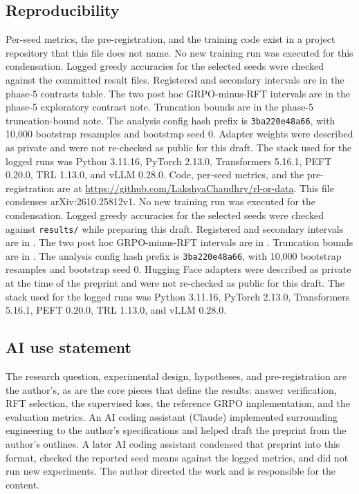 \subsection*{Reproducibility}
\ifanon
Per-seed metrics, the pre-registration, and the training code exist in a project repository that this file does not name. No new training run was executed for this condensation. Logged greedy accuracies for the selected seeds were checked against the committed result files. Registered and secondary intervals are in the phase-5 contrasts table. The two post hoc GRPO-minus-RFT intervals are in the phase-5 exploratory contrast note. Truncation bounds are in the phase-5 truncation-bound note. The analysis config hash prefix is \texttt{3ba220e48a66}, with 10{,}000 bootstrap resamples and bootstrap seed 0. Adapter weights were described as private and were not re-checked as public for this draft. The stack used for the logged runs was Python 3.11.16, PyTorch 2.13.0, Transformers 5.16.1, PEFT 0.20.0, TRL 1.13.0, and vLLM 0.28.0.
\else
Code, per-seed metrics, and the pre-registration are at \url{https://github.com/LakshyaChaudhry/rl-or-data}. This file condenses arXiv:2610.25812v1. No new training run was executed for the condensation. Logged greedy accuracies for the selected seeds were checked against \texttt{results/} while preparing this draft. Registered and secondary intervals are in . The two post hoc GRPO-minus-RFT intervals are in . Truncation bounds are in . The analysis config hash prefix is \texttt{3ba220e48a66}, with 10{,}000 bootstrap resamples and bootstrap seed 0. Hugging Face adapters were described as private at the time of the preprint and were not re-checked as public for this draft. The stack used for the logged runs was Python 3.11.16, PyTorch 2.13.0, Transformers 5.16.1, PEFT 0.20.0, TRL 1.13.0, and vLLM 0.28.0.
\fi

\subsection*{AI use statement}
The research question, experimental design, hypotheses, and pre-registration are the author's, as are the core pieces that define the results: answer verification, RFT selection, the supervised loss, the reference GRPO implementation, and the evaluation metrics. An AI coding assistant (Claude) implemented surrounding engineering to the author's specifications and helped draft the preprint from the author's outlines. A later AI coding assistant condensed that preprint into this format, checked the reported seed means against the logged metrics, and did not run new experiments. The author directed the work and is responsible for the content.





